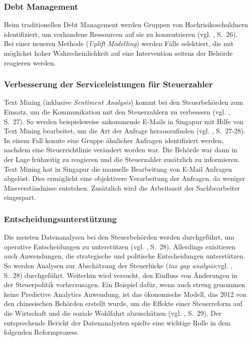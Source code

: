 \subsubsection{Debt Management}

Beim traditionellen Debt Management werden Gruppen von Hochrisikoschuldnern identifiziert, um vorhandene Ressourcen auf sie zu
konzentrieren (vgl. \cite{OECD}, S.~26). Bei einer neueren Methode (\emph{Uplift Modelling}) werden Fälle selektiert, die
mit möglichst hoher Wahrscheinlichkeit auf eine Intervention seitens der Behörde reagieren werden. 

\subsubsection{Verbesserung der Serviceleistungen für Steuerzahler}

Text Mining (inklusive \emph{Sentiment Analysis}) kommt bei den Steuerbehörden zum Einsatz, um die Kommunikation mit den
Steuerzahlern zu verbessern (vgl. \cite{OECD}, S.~27). So werden beispielsweise ankommende E-Mails in Singapur mit Hilfe
von Text Mining bearbeitet, um die Art der Anfrage herauszufinden (vgl. \cite{OECD}, S.~27-28). In einem Fall konnte eine
Gruppe ähnlicher Anfragen identifiziert werden, nachdem eine Steuerrichtlinie verändert worden war. Die Behörde war dann in
der Lage frühzeitig zu reagieren und die Steuerzahler zusätzlich zu informieren. Text Mining hat in Singapur die manuelle
Bearbeitung von E-Mail Anfragen abgelöst. Dies ermöglicht eine objektivere Verarbeitung der Anfragen, da weniger Missverständnisse
entstehen. Zusätzlich wird die Arbeitszeit der Sachbearbeiter eingespart.

\subsubsection{Entscheidungsunterstützung}

Die meisten Datenanalysen bei den Steuerbehörden werden durchgeführt, um operative
Entscheidungen zu unterstützen (vgl. \cite{OECD}, S.~28). Allerdings exisitieren auch
Anwendungen, die strategische und politische Entscheidungen unterstützen. So werden
Analysen zur Abschätzung der Steuerlücke (\emph{tax gap analysis};vgl. \cite{OECD}, S.~28) durchgeführt.
Weiterhin wird versucht, den Einfluss von Änderungen in der Steuerpolitik vorherzusagen. Ein Beispiel
dafür, wenn auch streng genommen keine Predictive Analytics Anwendung, ist das ökonomische Modell, das
2012 von den chinesischen Behörden erstellt wurde, um die Effekte einer Steuerreform auf die Wirtschaft
und die soziale Wohlfahrt abzuschätzen (vgl. \cite{OECD}, S.~29). Der entsprechende Bericht der
Datenanalysten spielte eine wichtige Rolle in dem folgenden Reformprozess.

